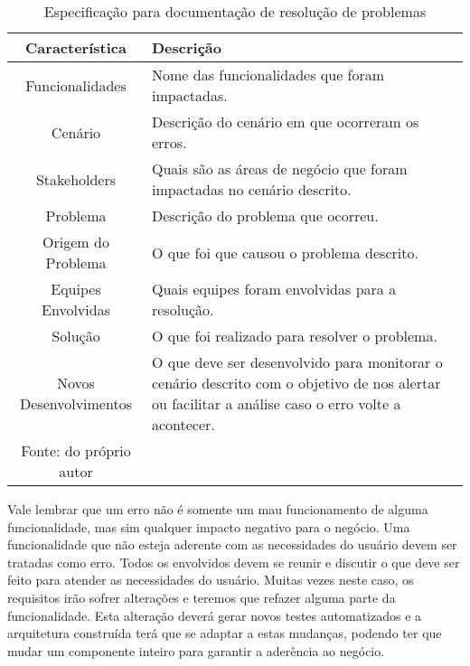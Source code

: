      \begin{table}[h!]
        \centering
        \label{Tabela:12}
        \caption{Especificação para documentação de resolução de problemas}
        \begin{tabular}{c p{9cm}}
          \hline
          \textbf{Característica} &
          \textbf{Descrição} \\
          \hline
          Funcionalidades &
          Nome das funcionalidades que foram impactadas. \\
          Cenário &
          Descrição do cenário em que ocorreram os erros. \\
          Stakeholders &
          Quais são as áreas de negócio que foram impactadas no cenário descrito. \\
          Problema &
          Descrição do problema que ocorreu. \\
          Origem do Problema &
          O que foi que causou o problema descrito. \\
          Equipes Envolvidas &
          Quais equipes foram envolvidas para a resolução. \\
          Solução &
          O que foi realizado para resolver o problema. \\
          Novos Desenvolvimentos &
          O que deve ser desenvolvido para monitorar o cenário descrito com o
          objetivo de nos alertar ou facilitar a análise caso o erro volte a
          acontecer. \\ \hline
          \newline
          \small{Fonte: do próprio autor}
        \end{tabular}
      \end{table}

      Vale lembrar que um erro não é somente um mau funcionamento de alguma
      funcionalidade, mas sim qualquer impacto negativo para o negócio. Uma
      funcionalidade que não esteja aderente com as necessidades do usuário devem
      ser tratadas como erro. Todos os envolvidos devem se reunir e discutir o que
      deve ser feito para atender as necessidades do usuário. Muitas vezes neste
      caso, os requisitos irão sofrer alterações e teremos que refazer alguma parte
      da funcionalidade. Esta alteração deverá gerar novos testes automatizados
      e a arquitetura construída terá que se adaptar a estas mudanças, podendo ter
      que mudar um componente inteiro para garantir a aderência ao negócio.

